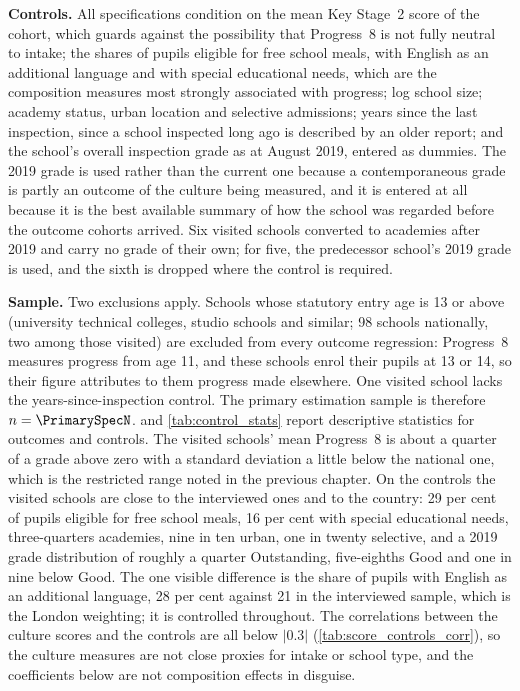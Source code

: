 \textbf{Controls.} All specifications condition on the mean Key Stage~2
score of the cohort, which guards against the possibility that Progress~8 is
not fully neutral to intake; the shares of pupils eligible for free school
meals, with English as an additional language and with special educational
needs, which are the composition measures most strongly associated with
progress; log school size; academy status, urban location and selective
admissions; years since the last inspection, since a school inspected long
ago is described by an older report; and the school's overall inspection
grade as at August 2019, entered as dummies. The 2019 grade is used rather
than the current one because a contemporaneous grade is partly an outcome of
the culture being measured, and it is entered at all because it is the best
available summary of how the school was regarded before the outcome cohorts
arrived. Six visited schools converted to academies after 2019 and carry no
grade of their own; for five, the predecessor school's 2019 grade is used,
and the sixth is dropped where the control is required.

\textbf{Sample.} Two exclusions apply. Schools whose statutory entry age is 13
or above (university technical colleges, studio schools and similar; 98
schools nationally, two among those visited) are excluded from every outcome
regression: Progress~8 measures progress from age 11, and these schools enrol
their pupils at 13 or 14, so their figure attributes to them progress made
elsewhere. One visited school lacks the years-since-inspection control. The
primary estimation sample is therefore $n = \PrimarySpecN$.
 and \cref{tab:control_stats} report descriptive
statistics for outcomes and controls. The visited schools' mean Progress~8 is
about a quarter of a grade above zero with a standard deviation a little
below the national one, which is the restricted range noted in the previous
chapter. On the controls the visited schools are close to the interviewed
ones and to the country: 29 per cent of pupils eligible for free school
meals, 16 per cent with special educational needs, three-quarters academies,
nine in ten urban, one in twenty selective, and a 2019 grade distribution of
roughly a quarter Outstanding, five-eighths Good and one in nine below Good.
The one visible difference is the share of pupils with English as an
additional language, 28 per cent against 21 in the interviewed sample, which
is the London weighting; it is controlled throughout. The correlations
between the culture scores and the controls are all below $|0.3|$
(\cref{tab:score_controls_corr}), so the culture measures are not close
proxies for intake or school type, and the coefficients below are not
composition effects in disguise.

